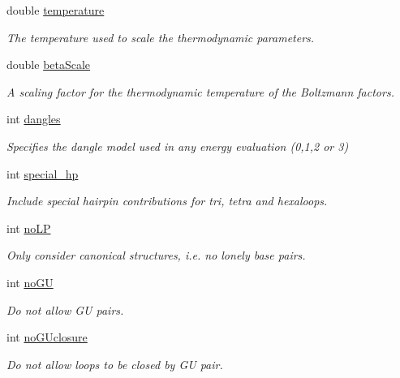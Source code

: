 \begin{DoxyCompactItemize}
\item 
double \mbox{\hyperlink{group__model__details_a5f7e5c2b65bada5188443470e576aa4b}{temperature}}
\begin{DoxyCompactList}\small\item\em The temperature used to scale the thermodynamic parameters. \end{DoxyCompactList}\item 
double \mbox{\hyperlink{group__model__details_a19524bf1d8d7ab590ed36edbbcaaba2c}{beta\+Scale}}
\begin{DoxyCompactList}\small\item\em A scaling factor for the thermodynamic temperature of the Boltzmann factors. \end{DoxyCompactList}\item 
int \mbox{\hyperlink{group__model__details_adcda4ff2ea77748ae0e8700288282efc}{dangles}}
\begin{DoxyCompactList}\small\item\em Specifies the dangle model used in any energy evaluation (0,1,2 or 3) \end{DoxyCompactList}\item 
int \mbox{\hyperlink{group__model__details_add64a96d23e77ef1d0ddf8dfc5228143}{special\+\_\+hp}}
\begin{DoxyCompactList}\small\item\em Include special hairpin contributions for tri, tetra and hexaloops. \end{DoxyCompactList}\item 
int \mbox{\hyperlink{group__model__details_a753200bf21cee0ea2df64afe43999f5d}{no\+LP}}
\begin{DoxyCompactList}\small\item\em Only consider canonical structures, i.\+e. no \textquotesingle{}lonely\textquotesingle{} base pairs. \end{DoxyCompactList}\item 
int \mbox{\hyperlink{group__model__details_ad64a5eaf9c4550e7525b36a725fec4b2}{no\+GU}}
\begin{DoxyCompactList}\small\item\em Do not allow GU pairs. \end{DoxyCompactList}\item 
int \mbox{\hyperlink{group__model__details_a7e883db1f33f8f3baa5c9b140350c78e}{no\+G\+Uclosure}}
\begin{DoxyCompactList}\small\item\em Do not allow loops to be closed by GU pair. \end{DoxyCompactList}\item 

\end{DoxyCompactItemize}
